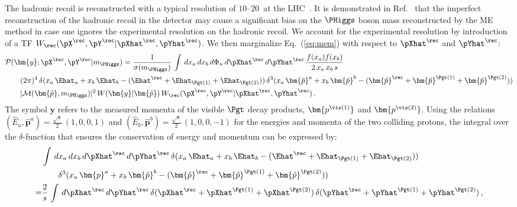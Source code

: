 The hadronic recoil is reconstructed with a typical resolution of $10$--$20$~\GeV at the LHC~\cite{CMS-JME-13-003,ATLAS-CONF-2014-019}.
It is demonstrated in Ref.~\cite{Alwall:2010cq} that the imperfect reconstruction of the hadronic recoil
in the detector may cause a significant bias on the $\PHiggs$ boson mass reconstructed by the ME method in case one ignores
the experimental resolution on the
hadronic recoil. We account
for the experimental resolution by introduction
of a TF $W_{\rec}( \pX^{\rec}, \pY^{\rec} | \pXhat^{\rec},
\pYhat^{\rec} )$.
We then marginalize Eq.~(\ref{eq:mem}) with respect to $\pXhat^{\rec}$ and $\pYhat^{\rec}$:
\begin{align}
& \mathcal{P}(\bm{y};\pX^{\rec},\pY^{\rec}|m_{\PHiggs}) =
\frac{1}{\sigma(m_{\PHiggs})} \, \int \, dx_{a} \, dx_{b} \, d\Phi_{n} \,
d\pXhat^{\rec} \, d\pYhat^{\rec} \, \frac{f(x_{a}) f(x_{b})}{2 \,
  x_{a} \, x_{b} \, s} \nonumber \\
& \qquad (2\pi)^{4} \, \delta( x_{a} \, \Ehat_{a} + x_{b} \, \Ehat_{b} -
(\Ehat^{\rec} + \Ehat_{\Pgt(1)} + \Ehat_{\Pgt(2)}) ) \, \delta^{3}( x_{a} \,
\bm{\hat{p}}^{a} + x_{b} \, \bm{\hat{p}}^{b} - (\bm{\hat{p}}^{\rec} + \bm{\hat{p}}^{\Pgt(1)}
+ \bm{\hat{p}}^{\Pgt(2)}) ) \nonumber \\
& \qquad \vert \mathcal{M}(\bm{\tilde{p}},m_{\PHiggs}) \vert^{2} \, W(\bm{y}|\bm{\hat{p}}) \, W_{\rec}( \pX^{\rec}, \pY^{\rec} | \pXhat^{\rec}, \pYhat^{\rec} ) \, .
\label{eq:mem_mod_hadRecoil}
\end{align}
The symbol $\bm{y}$ refers to the measured momenta of the visible $\Pgt$ decay products, $\bm{p^{\vis(1)}}$ and $\bm{p^{\vis(2)}}$.
Using the relations $(\hat{E}_{a},\bm{\hat{p}}^{a}) = \frac{\sqrt{s}}{2} \, (1, 0,
0, 1)$ and $(\hat{E}_{b},\bm{\hat{p}}^{b}) = \frac{\sqrt{s}}{2} \, (1,
0, 0, -1)$
for the energies and momenta of the two colliding protons,
the integral over the $\delta$-function that ensures the conservation of energy and momentum can be expressed by:
\begin{align}
& \int \, dx_{a} \, dx_{b} \, d\pXhat^{\rec} \, d\pYhat^{\rec} \, \delta(
x_{a} \, \Ehat_{a} + x_{b} \, \Ehat_{b} - (\Ehat^{\rec} +
\Ehat_{\Pgt(1)} + \Ehat_{\Pgt(2)})) \nonumber \\
& \qquad \delta^{3}(
x_{a} \, \bm{p}^{a} + x_{b} \, \bm{\hat{p}}^{b} - (\bm{\hat{p}}^{\rec} +
\bm{\hat{p}}^{\Pgt(1)} + \bm{\hat{p}}^{\Pgt(2)})) \nonumber \\
= & \frac{2}{s} \, \int \,
d\pXhat^{\rec} \, d\pYhat^{\rec} \, 
\delta( \pXhat^{\rec} + \pXhat^{\Pgt(1)} + \pXhat^{\Pgt(2)} ) \,
\delta( \pYhat^{\rec} + \pYhat^{\Pgt(1)} + \pYhat^{\Pgt(2)} ) \, ,
\label{eq:delta4}
\end{align}
